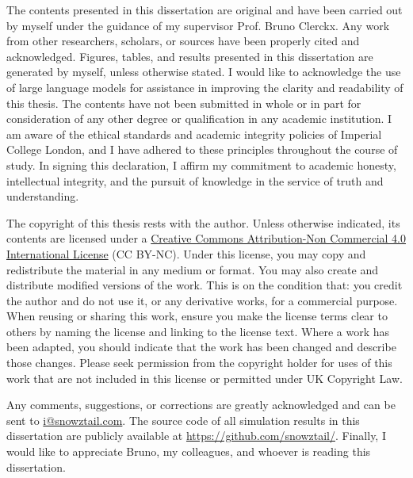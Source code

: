 
\begin{declaration}
	The contents presented in this dissertation are original and have been carried out by myself under the guidance of my supervisor Prof. Bruno Clerckx.
	Any work from other researchers, scholars, or sources have been properly cited and acknowledged.
	Figures, tables, and results presented in this dissertation are generated by myself, unless otherwise stated.
	I would like to acknowledge the use of large language models for assistance in improving the clarity and readability of this thesis.
	The contents have not been submitted in whole or in part for consideration of any other degree or qualification in any academic institution.
	I am aware of the ethical standards and academic integrity policies of Imperial College London, and I have adhered to these principles throughout the course of study.
	In signing this declaration, I affirm my commitment to academic honesty, intellectual integrity, and the pursuit of knowledge in the service of truth and understanding.

	The copyright of this thesis rests with the author. Unless otherwise indicated, its contents are licensed under a \href{https://creativecommons.org/licenses/by-nc/4.0/deed.en}{Creative Commons Attribution-Non Commercial 4.0 International License} (CC BY-NC). Under this license, you may copy and redistribute the material in any medium or format. You may also create and distribute modified versions of the work. This is on the condition that: you credit the author and do not use it, or any derivative works, for a commercial purpose. When reusing or sharing this work, ensure you make the license terms clear to others by naming the license and linking to the license text. Where a work has been adapted, you should indicate that the work has been changed and describe those changes. Please seek permission from the copyright holder for uses of this work that are not included in this license or permitted under UK Copyright Law.

	Any comments, suggestions, or corrections are greatly acknowledged and can be sent to \href{mailto:i@snowztail.com}{\url{i@snowztail.com}}.
	The source code of all simulation results in this dissertation are publicly available at \url{https://github.com/snowztail/}.
	Finally, I would like to appreciate Bruno, my colleagues, and whoever is reading this dissertation.
\end{declaration}
